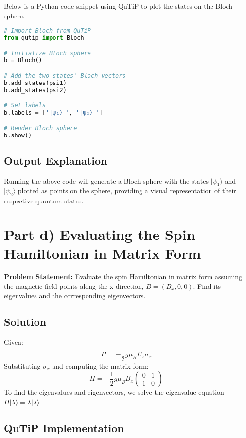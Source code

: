\documentclass[12pt]{article}
\begin{document}
Below is a Python code snippet using QuTiP to plot the states on the Bloch sphere.

\begin{lstlisting}[language=Python, caption=Plotting States on the Bloch Sphere using QuTiP]
# Import Bloch from QuTiP
from qutip import Bloch

# Initialize Bloch sphere
b = Bloch()

# Add the two states' Bloch vectors
b.add_states(psi1)
b.add_states(psi2)

# Set labels
b.labels = ['|ψ₁〉', '|ψ₂〉']

# Render Bloch sphere
b.show()
\end{lstlisting}

\subsection{Output Explanation}

Running the above code will generate a Bloch sphere with the states \( |\psi_1\rangle \) and \( |\psi_2\rangle \) plotted as points on the sphere, providing a visual representation of their respective quantum states.

\newpage

\section{Part d) Evaluating the Spin Hamiltonian in Matrix Form}

\textbf{Problem Statement:} Evaluate the spin Hamiltonian in matrix form assuming the magnetic field points along the x-direction, \( B = (B_x, 0, 0) \). Find its eigenvalues and the corresponding eigenvectors.

\subsection{Solution}

Given:
\[
H = -\frac{1}{2} g \mu_B B_x \sigma_x
\]
Substituting \( \sigma_x \) and computing the matrix form:
\[
H = -\frac{1}{2} g \mu_B B_x \begin{pmatrix} 0 & 1 \\ 1 & 0 \end{pmatrix}
\]
To find the eigenvalues and eigenvectors, we solve the eigenvalue equation \( H |\lambda\rangle = \lambda |\lambda\rangle \).

\subsection{QuTiP Implementation}
\end{document}
